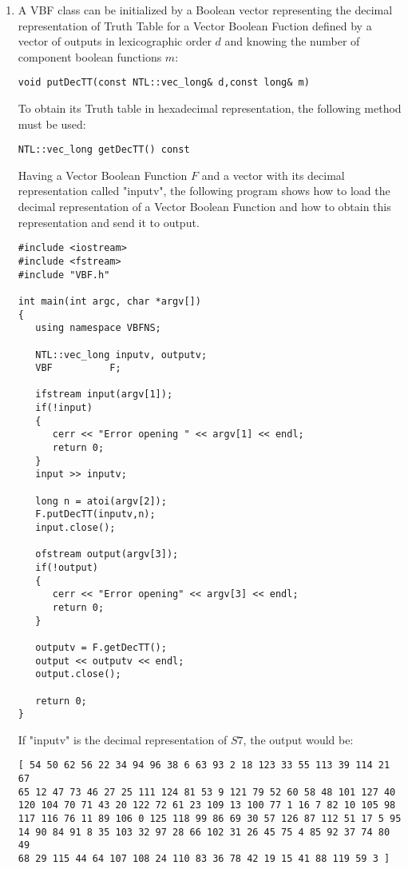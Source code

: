 \begin{enumerate}
\item A VBF class can be initialized by a Boolean vector representing the decimal representation of Truth Table for a Vector Boolean Fuction defined by a vector of outputs in lexicographic order $d$ and knowing the number of component boolean functions $m$:

\begin{verbatim}
void putDecTT(const NTL::vec_long& d,const long& m)
\end{verbatim}

To obtain its Truth table in hexadecimal representation, the following method must be used:

\begin{verbatim}
NTL::vec_long getDecTT() const
\end{verbatim}

Having a Vector Boolean Function $F$ and a vector with its decimal representation called "inputv", the following program shows how to load the decimal representation of a Vector Boolean Function and how to obtain this representation and send it to output.

\begin{verbatim}
#include <iostream>
#include <fstream>
#include "VBF.h"

int main(int argc, char *argv[])
{
   using namespace VBFNS;

   NTL::vec_long inputv, outputv;
   VBF          F;

   ifstream input(argv[1]);
   if(!input)
   {
      cerr << "Error opening " << argv[1] << endl;
      return 0;
   }
   input >> inputv;

   long n = atoi(argv[2]);
   F.putDecTT(inputv,n);
   input.close();

   ofstream output(argv[3]);
   if(!output)
   {
      cerr << "Error opening" << argv[3] << endl;
      return 0;
   }

   outputv = F.getDecTT();
   output << outputv << endl;
   output.close();

   return 0;
}

\end{verbatim}

If "inputv" is the decimal representation of $S7$, the output would be:

\begin{verbatim}
[ 54 50 62 56 22 34 94 96 38 6 63 93 2 18 123 33 55 113 39 114 21 67 
65 12 47 73 46 27 25 111 124 81 53 9 121 79 52 60 58 48 101 127 40 
120 104 70 71 43 20 122 72 61 23 109 13 100 77 1 16 7 82 10 105 98 
117 116 76 11 89 106 0 125 118 99 86 69 30 57 126 87 112 51 17 5 95 
14 90 84 91 8 35 103 32 97 28 66 102 31 26 45 75 4 85 92 37 74 80 49 
68 29 115 44 64 107 108 24 110 83 36 78 42 19 15 41 88 119 59 3 ] 
\end{verbatim}
 
\end{enumerate}


